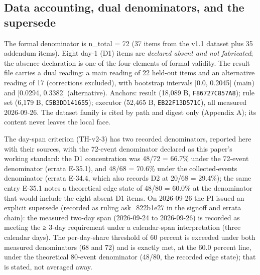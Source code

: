 \documentclass[11pt]{article}
\newcommand{\sha}[1]{\texttt{#1}}
\begin{document}
\subsection{Data accounting, dual denominators, and the supersede}
\noindent The formal denominator is n\_total = 72 (37 items from the v1.1 dataset plus 35 addendum items). Eight day-1 (D1) items are \emph{declared absent and not fabricated}; the absence declaration is one of the four elements of formal validity. The result file carries a dual reading: a main reading of 22 held-out items and an alternative reading of 17 (corrections excluded), with bootstrap intervals [0.0, 0.2045] (main) and [0.0294, 0.3382] (alternative). Anchors: result  (18,089 B, \sha{F86727C857A8}); rule set  (6,179 B, \sha{C5B3DD141655}); executor  (52,465 B, \sha{EB22F13D571C}), all measured 2026-09-26. The dataset family is cited by path and digest only (Appendix A); its content never leaves the local face.\par
\noindent The day-span criterion (TH-v2-3) has two recorded denominators, reported here with their sources, with the 72-event denominator declared as this paper's working standard: the D1 concentration was 48/72 = 66.7\% under the 72-event denominator (errata E-35.1), and 48/68 = 70.6\% under the collected-events denominator (errata E-34.4, which also records D2 at 20/68 = 29.4\%); the same entry E-35.1 notes a theoretical edge state of 48/80 = 60.0\% at the denominator that would include the eight absent D1 items. On 2026-09-26 the PI issued an explicit supersede (recorded as ruling ask\_822b1e27 in the signoff and errata chain): the measured two-day span (2026-09-24 to 2026-09-26) is recorded as meeting the ≥ 3-day requirement under a calendar-span interpretation (three calendar days). The per-day-share threshold of 60 percent is exceeded under both measured denominators (68 and 72) and is exactly met, at the 60.0 percent line, under the theoretical 80-event denominator (48/80, the recorded edge state); that is stated, not averaged away.\par
\end{document}
